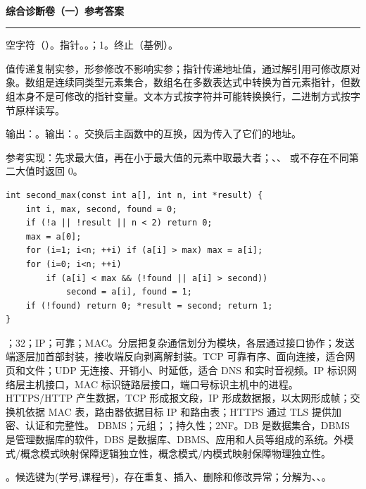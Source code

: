 \documentclass[a4paper,11pt]{article}
\renewcommand{\examtitle}{\thispagestyle{empty}\begin{center}\vspace*{1.5cm}{\fontsize{20pt}{28pt}\selectfont\bfseries\color{ctp-text}341 农业综合知识三}\\[0.3cm]{\fontsize{14pt}{18pt}\selectfont\bfseries\color{ctp-mauve}综合诊断卷（一）参考答案}\end{center}\vspace{0.8cm}\hrule\vspace{0.8cm}\setcounter{page}{1}}
\begin{document}
\examtitle
{}
\q 空字符（）。\quad \q 指针。\quad \q {}。\quad {}；1。\quad \q 终止（基例）。\par
\q 值传递复制实参，形参修改不影响实参；指针传递地址值，通过解引用可修改原对象。\quad \q 数组是连续同类型元素集合，数组名在多数表达式中转换为首元素指针，但数组本身不是可修改的指针变量。\quad \q 文本方式按字符并可能转换换行，二进制方式按字节原样读写。\par
\q 输出：。\quad \q 输出：。\quad \q 交换后主函数中的互换，因为传入了它们的地址。\par
\q 参考实现：先求最大值，再在小于最大值的元素中取最大者；、、 或不存在不同第二大值时返回 0。
\begin{lstlisting}[language={[custom]C}]
int second_max(const int a[], int n, int *result) {
    int i, max, second, found = 0;
    if (!a || !result || n < 2) return 0;
    max = a[0];
    for (i=1; i<n; ++i) if (a[i] > max) max = a[i];
    for (i=0; i<n; ++i)
        if (a[i] < max && (!found || a[i] > second))
            second = a[i], found = 1;
    if (!found) return 0; *result = second; return 1;
}
\end{lstlisting}
；32；IP；可靠；MAC。\quad \q 分层把复杂通信划分为模块，各层通过接口协作；发送端逐层加首部封装，接收端反向剥离解封装。\quad \q TCP 可靠有序、面向连接，适合网页和文件；UDP 无连接、开销小、时延低，适合 DNS 和实时音视频。\quad \q IP 标识网络层主机接口，MAC 标识链路层接口，端口号标识主机中的进程。\quad \q HTTPS/HTTP 产生数据，TCP 形成报文段，IP 形成数据报，以太网形成帧；交换机依据 MAC 表，路由器依据目标 IP 和路由表；HTTPS 通过 TLS 提供加密、认证和完整性。
\q DBMS；元组；；持久性；2NF。\quad \q DB 是数据集合，DBMS 是管理数据库的软件，DBS 是数据库、DBMS、应用和人员等组成的系统。\quad \q 外模式/概念模式映射保障逻辑独立性，概念模式/内模式映射保障物理独立性。\par
\q {}\quad {}\quad{}。\quad 候选键为(学号,课程号)，存在重复、插入、删除和修改异常；分解为、、。
\end{document}
